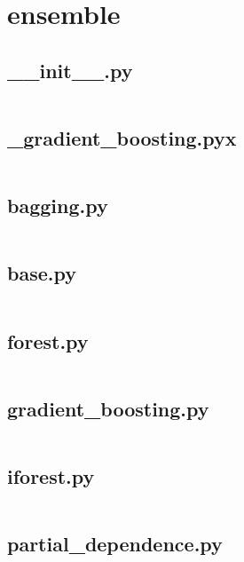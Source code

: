 \documentclass{article}
\begin{document}
\section{ensemble}

\subsection{\_\_init\_\_.py}
\inputminted{python}{/home/dufferzafar/dev/@clones/scikit-learn/sklearn/ensemble/__init__.py}
\newpage

\subsection{\_gradient\_boosting.pyx}
\inputminted{cython}{/home/dufferzafar/dev/@clones/scikit-learn/sklearn/ensemble/_gradient_boosting.pyx}
\newpage

\subsection{bagging.py}
\inputminted{python}{/home/dufferzafar/dev/@clones/scikit-learn/sklearn/ensemble/bagging.py}
\newpage

\subsection{base.py}
\inputminted{python}{/home/dufferzafar/dev/@clones/scikit-learn/sklearn/ensemble/base.py}
\newpage

\subsection{forest.py}
\inputminted{python}{/home/dufferzafar/dev/@clones/scikit-learn/sklearn/ensemble/forest.py}
\newpage

\subsection{gradient\_boosting.py}
\inputminted{python}{/home/dufferzafar/dev/@clones/scikit-learn/sklearn/ensemble/gradient_boosting.py}
\newpage

\subsection{iforest.py}
\inputminted{python}{/home/dufferzafar/dev/@clones/scikit-learn/sklearn/ensemble/iforest.py}
\newpage

\subsection{partial\_dependence.py}
\inputminted{python}{/home/dufferzafar/dev/@clones/scikit-learn/sklearn/ensemble/partial_dependence.py}
\newpage
\end{document}
